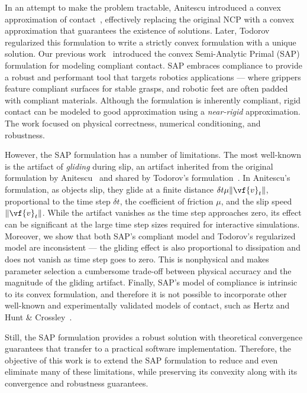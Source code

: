 In an attempt to make the problem tractable, Anitescu introduced a convex
approximation of contact~\cite{bib:anitescu2006}, effectively replacing
the original NCP with a convex approximation that guarantees the existence of solutions.
Later, Todorov~\cite{bib:todorov2011} regularized this formulation to write a strictly
convex formulation with a unique solution. Our previous work~\cite{bib:castro2022unconstrained}
introduced the convex Semi-Analytic Primal
(SAP) formulation for modeling compliant contact. SAP embraces compliance
to provide a robust and performant tool that targets robotics applications ---
where grippers feature compliant surfaces for stable grasps, and robotic feet
are often padded with compliant materials. Although the formulation is
inherently compliant, rigid contact can be modeled to good approximation using a
\emph{near-rigid} approximation. The work focused on physical correctness,
numerical conditioning, and robustness.

However, the SAP formulation has a number of limitations. The most well-known is
the artifact of \emph{gliding} during slip, an artifact inherited from the
original formulation by Anitescu~\cite{bib:mazhar2014} and shared by Todorov's
formulation~\cite{bib:todorov2011}. In Anitescu's formulation, as objects slip, they
glide at a finite distance $\delta t\mu\Vert\vf{v}_t\Vert$, proportional to the
time step $\delta t$, the coefficient of friction $\mu$, and the slip speed
$\Vert\vf{v}_t\Vert$. While the artifact vanishes as the time step approaches zero,
its effect can be significant at the large time step sizes required for interactive
simulations. Moreover, we show that both SAP's compliant model and
Todorov's regularized model are inconsistent --- the gliding effect is also
proportional to dissipation and does not vanish as time step goes to zero. This
is nonphysical and makes parameter selection a cumbersome trade-off between
physical accuracy and the magnitude of the gliding artifact. Finally, SAP's
model of compliance is intrinsic to its convex formulation, and therefore it is
not possible to incorporate other well-known and experimentally validated models
of contact, such as Hertz and Hunt \& Crossley~\cite{bib:hunt_crossley}.

Still, the SAP formulation provides a robust solution with theoretical
convergence guarantees that transfer to a practical software implementation.
Therefore, the objective of this work is to extend the SAP formulation to reduce
and even eliminate many of these limitations, while preserving its
convexity along with its convergence and robustness guarantees.
